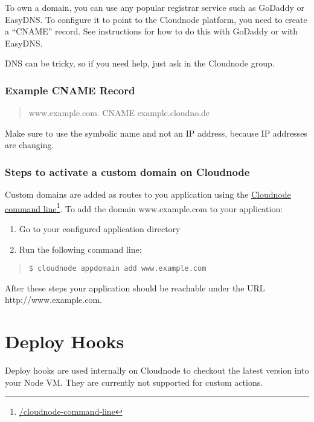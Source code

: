 To own a domain, you can use any popular registrar service such as GoDaddy or EasyDNS.
To configure it to point to the Cloudnode platform, you need to create a ``CNAME'' record. See instructions for how to do this with GoDaddy or with EasyDNS.

DNS can be tricky, so if you need help, just ask in the Cloudnode group.

\subsection{Example CNAME Record}
\label{examplecnamerecord}

\begin{quote}

www.example.com. CNAME example.cloudno.de
\end{quote}

Make sure to use the symbolic name and not an IP address, because IP addresses are changing.

\subsection{Steps to activate a custom domain on Cloudnode}
\label{stepstoactivateacustomdomainoncloudnode}

Custom domains are added as routes to you application using the \href{/cloudnode-command-line}{Cloudnode command line}\footnote{\href{/cloudnode-command-line}{\slash cloudnode-command-line}}. To add the domain www.example.com to your application:

\begin{enumerate}
\item Go to your configured application directory

\item Run the following command line:

\end{enumerate}

\begin{quote}

\begin{verbatim}
$ cloudnode appdomain add www.example.com    
\end{verbatim}

\end{quote}

After these steps your application should be reachable under the URL http:/\slash www.example.com.

\chapter{Deploy Hooks}
\label{deployhooks}

Deploy hooks are used internally on Cloudnode to checkout the latest version into your Node VM. They are currently not supported for custom actions.




